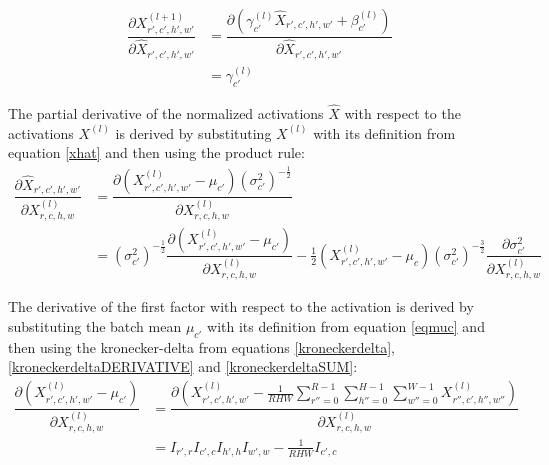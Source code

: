 \documentclass[a4paper,11pt,twoside]{article}
\newcommand*{\pd}[2]{\ensuremath{\dfrac{\partial #1}{\partial #2}}}
\begin{document}
\begin{equation}\label{BN_dxdxhat}
\begin{split}
	\pd{X^{(l+1)}_{r',c',h',w'}}{\hat{X}_{r',c',h',w'}}
		& = \pd{(\gamma_{c'}^{(l)} \hat{X}_{r',c',h',w'} + \beta_{c'}^{(l)})}{\hat{X}_{r',c',h',w'}} \\
		& =\gamma_{c'}^{(l)}
\end{split}
\end{equation}

The partial derivative of the normalized activations $\hat{X}$ with respect to the activations $X^{(l)}$ is derived by substituting $X^{(l)}$ with its definition from equation \eqref{xhat} and then using the product rule: \cite{webBN1} \cite{webBN2}
\begin{equation}\label{BN_kedjeregeln}
\begin{split}
\pd{\hat{X}_{r',c',h',w'}}{{X}^{(l)}_{r,c,h,w}} 
	& = \pd{(X^{(l)}_{r',c',h',w'} - \mu_{c'}){(\sigma^2_{c'})}^{-\frac{1}{2}}}{{X}^{(l)}_{r,c,h,w}} \\
	& = {(\sigma^2_{c'})}^{-\frac{1}{2}} \pd{(X^{(l)}_{r',c',h',w'} - \mu_{c'})}{{X}^{(l)}_{r,c,h,w}} - \frac{1}{2}(X^{(l)}_{r',c',h',w'} - \mu_c){(\sigma^2_{c'})}^{-\frac{3}{2}} \pd{\sigma^2_{c'}}{{X}^{(l)}_{r,c,h,w}}
\end{split}
\end{equation}

The derivative of the first factor with respect to the activation is derived by substituting the batch mean $\mu_{c'}$ with its definition from equation \eqref{eqmuc} and then using the kronecker-delta from equations \eqref{kroneckerdelta}, \eqref{kroneckerdeltaDERIVATIVE} and \eqref{kroneckerdeltaSUM}: \cite{webBN1} \cite{webBN2}
\begin{equation}\label{mu'}
\begin{split}
\pd{(X^{(l)}_{r',c',h',w'} - \mu_{c'})}{{X}^{(l)}_{r,c,h,w}}
	& = \pd{({X^{(l)}_{r',c',h',w'} - \frac{1}{RHW} \sum\limits^{R-1}_{r''=0} \sum\limits^{H-1}_{h''=0} \sum\limits^{W-1}_{w''=0} X^{(l)}_{r'',c',h'',w''}})}{{X}^{(l)}_{r,c,h,w}} \\
	& = I_{r',r} I_{c',c} I_{h',h} I_{w',w} - \frac{1}{RHW} I_{c',c}
\end{split}
\end{equation}
\end{document}
